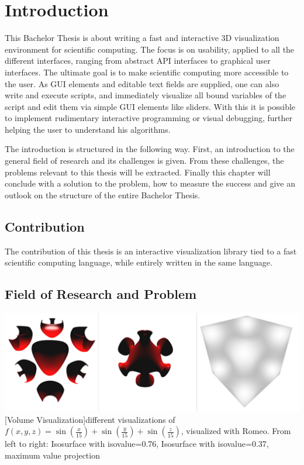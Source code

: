 \section{Introduction}
This Bachelor Thesis is about writing a fast and interactive 3D visualization environment for scientific computing. 
The focus is on usability, applied to all the different interfaces, ranging from abstract API interfaces to graphical user interfaces. 
The ultimate goal is to make scientific computing more accessible to the user.
As \ac{GUI} elements and editable text fields are supplied, one can also write and execute scripts, 
and immediately visualize all bound variables of the script and edit them via simple \ac{GUI} elements like sliders. 
With this it is possible to implement rudimentary interactive programming or visual debugging, further helping the user to understand his algorithms.

The introduction is structured in the following way.
First, an introduction to the general field of research and its challenges is given. 
From these challenges, the problems relevant to this thesis will be extracted.
Finally this chapter will conclude with a solution to the problem, how to measure the success and give an outlook on the structure of the entire Bachelor Thesis.
 

\subsection{Contribution}
The contribution of this thesis is an interactive visualization library tied to a fast scientific computing language, while entirely written in the same language.

\subsection{Field of Research and Problem}

\vspace{1em}
\begin{minipage}{\linewidth}
    \centering
    \includegraphics[width=0.7\linewidth]{graphics/surfaces.png}
    [Volume Visualization]{different visualizations of $f(x,y,z)=\sin(\frac{x}{15})+\sin(\frac{y}{15})+\sin(\frac{z}{15})$, visualized with Romeo. From left to right: Isosurface with isovalue=0.76, Isosurface with isovalue=0.37, maximum value projection}
    \label{fig:volume}
\end{minipage}
\vspace{1em}

